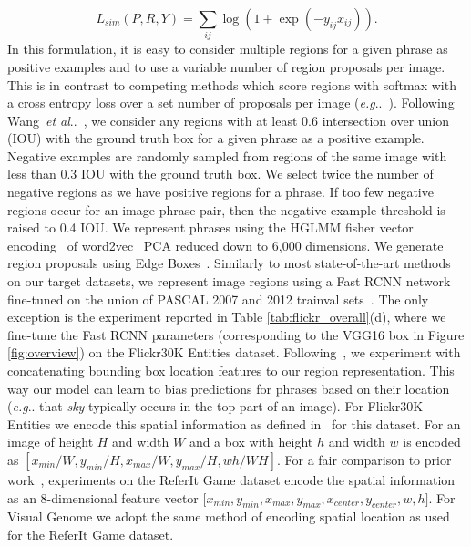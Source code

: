 \documentclass[runningheads]{llncs}
\makeatletter
\DeclareRobustCommand\onedot{\futurelet\@let@token\@onedot}
\def\@onedot{\ifx\@let@token.\else.\null\fi\xspace}
\def\eg{\emph{e.g}\onedot} \def\Eg{\emph{E.g}\onedot}
\def\etal{\emph{et al}\onedot}
\makeatother
\begin{document}
\begin{equation}
L_{sim}(P,R,Y) = \sum_{ij}\log(1 + \exp{(-y_{ij}x_{ij})}).
\end{equation}\noindent In this formulation, it is easy to consider multiple regions for a given phrase as positive examples and to use a variable number of region proposals per image.  This is in contrast to competing methods which score regions with softmax with a cross entropy loss over a set number of proposals per image (\eg~\cite{fukui16emnlp,rohrbach2015,ChenICMR2017}).
\smallskip{}  Following Wang~\etal~\cite{wangTwoBranch2017}, we consider any regions with at least 0.6 intersection over union (IOU) with the ground truth box for a given phrase as a positive example.  Negative examples are randomly sampled from regions of the same image with less than 0.3 IOU with the ground truth box.  We select twice the number of negative regions as we have positive regions for a phrase.  If too few negative regions occur for an image-phrase pair, then the negative example threshold is raised to 0.4 IOU.
\smallskip{} We represent phrases using the HGLMM fisher vector encoding~\cite{klein2014fisher} of word2vec~\cite{mikolov2013efficient} PCA reduced down to 6,000 dimensions. We generate region proposals using Edge Boxes~\cite{ZitnickECCV14}. Similarly to most state-of-the-art methods on our target datasets, we represent image regions using a Fast RCNN network~\cite{girshickICCV15fastrcnn} fine-tuned on the union of PASCAL 2007 and 2012 trainval sets~\cite{pascal-voc-2012}. The only exception is the experiment reported in Table \ref{tab:flickr_overall}(d), where we fine-tune the Fast RCNN parameters (corresponding to the VGG16 box in Figure \ref{fig:overview}) on the Flickr30K Entities dataset.
\smallskip{} Following~\cite{rohrbach2015,ChenICMR2017,ChenICCV2017,yu2016context}, we experiment with concatenating bounding box location features to our region representation.  This way our model can learn to bias predictions for phrases based on their location (\eg that \emph{sky} typically occurs in the top part of an image).  For Flickr30K Entities we encode this spatial information as defined in~\cite{ChenICMR2017,ChenICCV2017} for this dataset.  For an image of height $H$ and width $W$ and a box with height $h$ and width $w$ is encoded as $[x_{min}/W, y_{min}/H, x_{max}/W, y_{max}/H, wh/WH]$. For a fair comparison to prior work~\cite{rohrbach2015,ChenICMR2017,ChenICCV2017},  experiments on the ReferIt Game dataset encode the spatial information as an 8-dimensional feature vector $[x_{min}, y_{min}, x_{max}, y_{max}, x_{center},$$ y_{center}, w, h]$.  For Visual Genome we adopt the same method of encoding spatial location as used for the ReferIt Game dataset.
\end{document}
